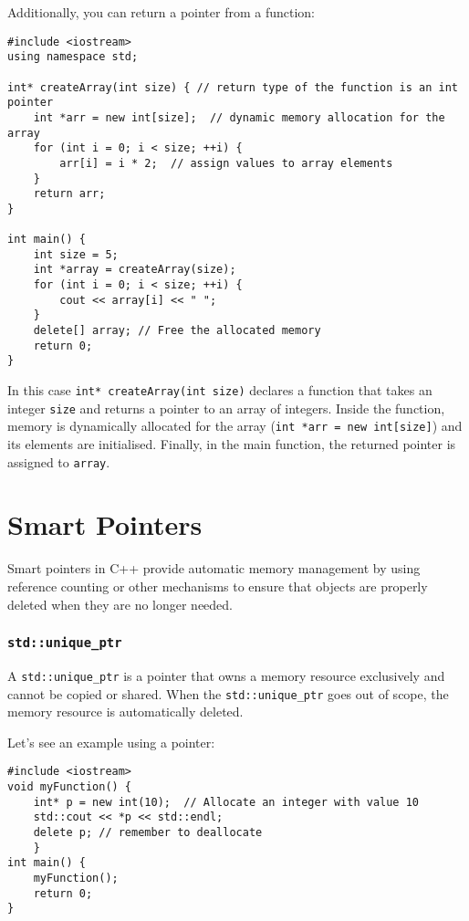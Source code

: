\documentclass{article}
\begin{document}
Additionally, you can return a pointer from a function:

\begin{verbatim}
#include <iostream>
using namespace std;

int* createArray(int size) { // return type of the function is an int pointer
    int *arr = new int[size];  // dynamic memory allocation for the array
    for (int i = 0; i < size; ++i) {
        arr[i] = i * 2;  // assign values to array elements
    }
    return arr;
}

int main() {
    int size = 5;
    int *array = createArray(size);
    for (int i = 0; i < size; ++i) {
        cout << array[i] << " ";
    }
    delete[] array; // Free the allocated memory
    return 0;
}
\end{verbatim}

In this case \texttt{int* createArray(int size)} declares a function that  takes an integer \verb|size| and returns a pointer to an array of integers. Inside the function, memory is dynamically allocated for the array (\texttt{int *arr = new int[size]}) and its elements are initialised.
Finally, in the main function, the returned pointer is assigned to \verb|array|.

\section{Smart Pointers}
Smart pointers in C++ provide automatic memory management by using reference counting or other mechanisms to ensure that objects are properly deleted when they are no longer needed.

\cprotect\subsubsection{\verb+std::unique_ptr+}
A \verb+std::unique_ptr+ is a pointer that owns a memory resource exclusively and cannot be copied or shared. When the \verb+std::unique_ptr+ goes out of scope, the memory resource is automatically deleted.

Let's see an example using a pointer:

\begin{verbatim}
#include <iostream>
void myFunction() {
    int* p = new int(10);  // Allocate an integer with value 10
    std::cout << *p << std::endl;
    delete p; // remember to deallocate
    }
int main() {
    myFunction();
    return 0;
}
\end{verbatim}
\end{document}

